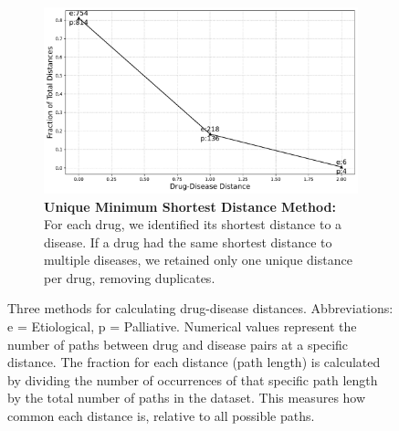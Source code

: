 \documentclass[journal,twoside,web]{ieeecolor}
\begin{document}
\begin{figure}
\begin{subfigure}{\linewidth}
   \label{fig:yildirim2}
\end{subfigure}
\begin{subfigure}{\linewidth}
   \includegraphics[width=\linewidth]{Figures/Yildrim_unique_minimum_shortest_distance.pdf}
   \caption{\textbf{Unique Minimum Shortest Distance Method:} 
   For each drug, we identified its shortest distance to a disease. 
   If a drug had the same shortest distance to multiple diseases, we retained only one unique distance per drug, removing duplicates.
   }
   \label{fig:yildirim3}
\end{subfigure}
\caption{Three methods for calculating drug-disease distances.
Abbreviations: e = Etiological, p = Palliative. 
Numerical values represent the number of paths between drug and disease pairs at a specific distance. 
The fraction for each distance (path length) is calculated by dividing the number of occurrences of that specific path length by the total number of paths in the dataset.
This measures how common each distance is, relative to all possible paths.}
\label{fig:yildirim}
\end{figure}

\end{document}
